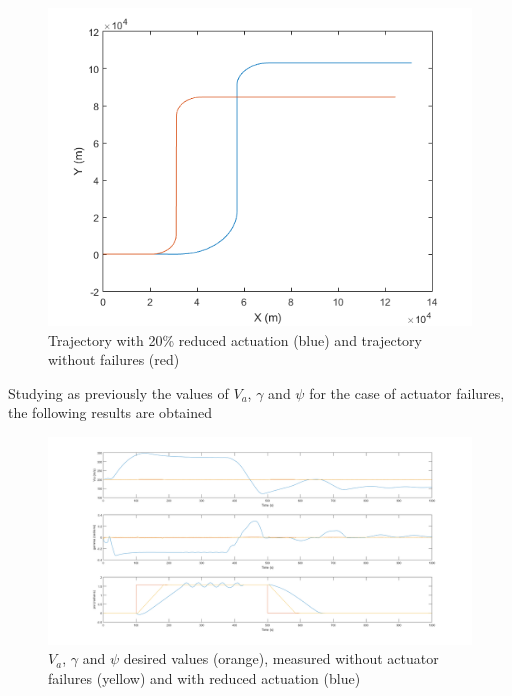 \begin{figure}[H]
\centering
\includegraphics[width=\textwidth]{Figures/Results/reduced_act.png}
\caption[Trajectory with reduced actuation]{Trajectory with 20\% reduced actuation (blue) and trajectory without failures (red)}
\label{fig:reduced_act}
\end{figure}

Studying as previously the values of $V_a$, $\gamma$ and $\psi$ for the case of actuator failures, the following results are obtained 

\begin{figure}[H]
\centering
\includegraphics[width=1.1\textwidth]{Figures/Results/ref_act_failure.png}
\caption[$V_a$, $\gamma$ and $\psi$ measured and desired values on actuation failure]{$V_a$, $\gamma$ and $\psi$ desired  values (orange), measured without actuator failures (yellow) and with reduced actuation (blue)}
\label{fig:ref_act_fail}
\end{figure}

